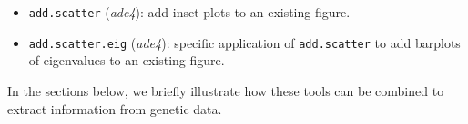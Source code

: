 \documentclass{article}
\begin{document}
\begin{itemize}
  \item \texttt{add.scatter} (\textit{ade4}): add inset plots to an existing figure.
  \item \texttt{add.scatter.eig} (\textit{ade4}): specific application of \texttt{add.scatter} to
    add barplots of eigenvalues to an existing figure.
\end{itemize}

\noindent In the sections below, we briefly illustrate how these tools can be combined to extract information from
genetic data.




\end{document}
